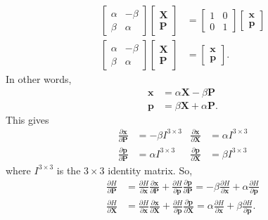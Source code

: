 \documentclass[10pt]{article}
\newcommand{\ve}[1]{\mathbf{#1}}
\begin{document}
\begin{itemize}
\begin{align*}
\begin{bmatrix}
  			\alpha & -\beta \\
  			\beta & \alpha
  		\end{bmatrix}
  		\begin{bmatrix}
  			\ve{X} \\
  			\ve{P}
  		\end{bmatrix}
  		&= 
  		\begin{bmatrix}
  			1 & 0 \\
  			0 & 1
  		\end{bmatrix}
  		\begin{bmatrix}
  			\ve{x} \\
  			\ve{p}
  		\end{bmatrix} \\
  		\begin{bmatrix}
  			\alpha & -\beta \\
  			\beta & \alpha
  		\end{bmatrix}
  		\begin{bmatrix}
  			\ve{X} \\
  			\ve{P}
  		\end{bmatrix}
  		&=   		
  		\begin{bmatrix}
  			\ve{x} \\
  			\ve{p}
  		\end{bmatrix}.
  	\end{align*}
  	In other words,
  	\begin{align*}
  		\ve{x} &= \alpha \ve{X} - \beta \ve{P} \\
  		\ve{p} &= \beta \ve{X} + \alpha \ve{P}.
  	\end{align*}
  	This gives
  	\begin{align*}
  		\frac{\partial\ve{x}}{\partial \ve{P}} &= -\beta I^{3\times 3}
  		&\frac{\partial\ve{x}}{\partial \ve{X}} &= \alpha I^{3\times 3} \\
  		\frac{\partial\ve{p}}{\partial \ve{P}} &= \alpha I^{3\times 3}
  		&\frac{\partial\ve{p}}{\partial \ve{X}} &= \beta I^{3\times 3}
  	\end{align*}
  	where $I^{3\times 3}$ is the $3 \times 3$ identity matrix. So,
  	\begin{align*}
  		\frac{\partial H}{\partial \ve{P}}
  		&= \frac{\partial H}{\partial \ve{x}} \frac{\partial \ve{x}}{\partial \ve{P}} + \frac{\partial H}{\partial \ve{p}} \frac{\partial \ve{p}}{\partial \ve{P}}
  		= -\beta \frac{\partial H}{\partial \ve{x}} + \alpha \frac{\partial H}{\partial \ve{p}} \\
  		\frac{\partial H}{\partial \ve{X}}
  		&= \frac{\partial H}{\partial \ve{x}} \frac{\partial \ve{x}}{\partial \ve{X}} + \frac{\partial H}{\partial \ve{p}} \frac{\partial \ve{p}}{\partial \ve{X}} 
  		=  \alpha \frac{\partial H}{\partial \ve{x}}  + \beta \frac{\partial H}{\partial \ve{p}}.
  	\end{align*}


\end{itemize}
\end{document}
